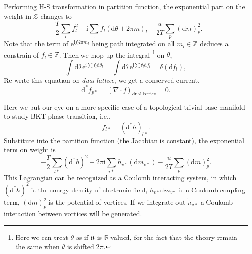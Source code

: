 Performing H-S transformation in partition function, the exponential part on the weight in $\mathcal{Z}$ changes to
\begin{equation}
  -\frac{T}{2} \sum_{l} f_l^{2} + \mathrm{i} \sum_{l} f_l \left( \mathrm{d} \theta + 2\pi  m \right)_{l} - \frac{u}{2T} \sum_{p} \left( \mathrm{d} m \right)_{p}^{2}.
\end{equation}
Note that the term of $\mathrm{e}^{\mathrm{i} f_l 2\pi m_l}$ being path integrated on all $m_l \in \mathbb{Z}$ deduces a constrain of $f_l \in \mathbb{Z}$. Then we mop up the integral \footnote{Here we can treat $\theta$ as if it is $\mathbb{R}$-valued, for the fact that the theory remain the same when $\theta$ is shifted $2\pi $.} on $\theta$,
\begin{equation}
  \int \mathrm{d} \theta \, \mathrm{e}^{ \mathrm{i}\sum f_l \mathrm{d} \theta_{l}} = \int \mathrm{d} \theta \, \mathrm{e}^{\mathrm{i} \sum \theta_{l} \mathrm{d} f_l} = \delta\left( \mathrm{d} f_l \right),
\end{equation}
Re-write this equation on \emph{dual lattice}, we get a conserved current,
\begin{equation}
  \mathrm{d} ^* f_{p*} = \left( \nabla \cdot f \right)_{\text{dual lattice}} = 0.
\end{equation}

Here we put our eye on a more specific case of a topological trivial base manifold to study BKT phase transition, i.e.,
\begin{equation}
  f_{l*} = \left( \mathrm{d} ^{*} h \right)_{l*}.
\end{equation}
Substitute into the partition function (the Jacobian is constant), the exponential term on weight is
\begin{equation}
  - \frac{T}{2} \sum_{l*} \left( \mathrm{d} ^{*} h\right)^{2} - 2\pi  \mathrm{i} \sum_{v*} h_{v*} \left( \mathrm{d} m_{v*} \right) - \frac{u}{2T} \sum_{p} \left( \mathrm{d} m \right)_{p}^{2}.
\end{equation}
This Lagrangian can be recognized as a Coulomb interacting system, in which $\left( \mathrm{d} ^{*} h \right)^{2}$ is the energy density of electronic field, $h_{v*} \mathrm{d} m_{v*}$ is a Coulomb coupling term, $\left( \mathrm{d} m \right)_{p}^{2}$ is the potential of vortices.
If we integrate out $\tilde{h}_{v*}$ a Coulomb interaction between vortices will be generated.
